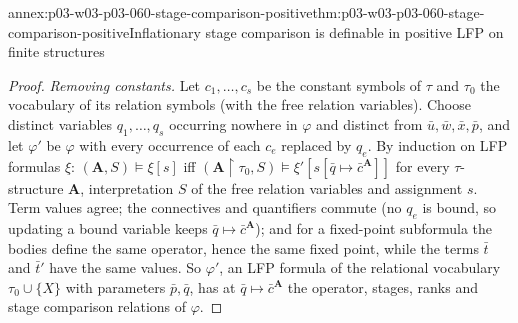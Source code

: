 \begin{annexitem}{annex:p03-w03-p03-060-stage-comparison-positive}{thm:p03-w03-p03-060-stage-comparison-positive}{Inflationary stage comparison is definable in positive LFP on finite structures}
\begin{proof}
\emph{Removing constants.} Let \(c_1,\ldots,c_s\) be the constant symbols
of \(\tau\) and \(\tau_0\) the vocabulary of its relation symbols (with the
free relation variables). Choose distinct variables \(q_1,\ldots,q_s\)
occurring nowhere in \(\varphi\) and distinct from
\(\bar u,\bar w,\bar x,\bar p\), and let \(\varphi'\) be \(\varphi\) with
every occurrence of each \(c_e\) replaced by \(q_e\). By induction on LFP
formulas \(\xi\): \((\mathbf A,S)\models\xi[s]\) iff
\((\mathbf A{\restriction}\tau_0,S)\models\xi'[s[\bar q\mapsto\bar c^{\mathbf A}]]\)
for every \(\tau\)-structure \(\mathbf A\), interpretation \(S\) of the
free relation variables and assignment \(s\). Term values agree; the
connectives and quantifiers commute (no \(q_e\) is bound, so updating a
bound variable keeps \(\bar q\mapsto\bar c^{\mathbf A}\)); and for a
fixed-point subformula the bodies define the same operator, hence the same
fixed point, while the terms \(\bar t\) and \(\bar t'\) have the same
values. So \(\varphi'\), an LFP formula of the relational vocabulary
\(\tau_0\cup\{X\}\) with parameters \(\bar p,\bar q\), has at
\(\bar q\mapsto\bar c^{\mathbf A}\) the operator, stages, ranks and stage
comparison relations of \(\varphi\).


\end{proof}
\end{annexitem}
